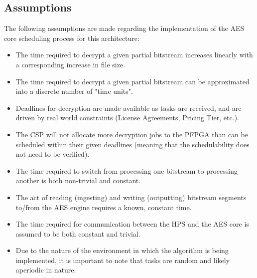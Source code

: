 \subsection{Assumptions}\label{subsec:EDFAssumptions}
The following assumptions are made regarding the implementation of the AES core scheduling process for this architecture:
\begin{itemize}
    \item The time required to decrypt a given partial bitstream increases linearly with a corresponding increase in file size.
    \item The time required to decrypt a given partial bitstream can be approximated into a discrete number of "time units".
    \item Deadlines for decryption are made available as tasks are received, and are driven by real world constraints (License Agreements, Pricing Tier, etc.).
    \item The CSP will not allocate more decryption jobs to the PFPGA than can be scheduled within their given deadlines (meaning that the schedulability does not need to be verified).
    \item The time required to switch from processing one bitstream to processing another is both non-trivial and constant.
    \item The act of reading (ingesting) and writing (outputting) bitstream segments to/from the AES engine requires a known, constant time.
    \item The time required for communication between the HPS and the AES core is assumed to be both constant and trivial.
    \item Due to the nature of the environment in which the algorithm is being implemented, it is important to note that tasks are random and likely aperiodic in nature.
\end{itemize}

